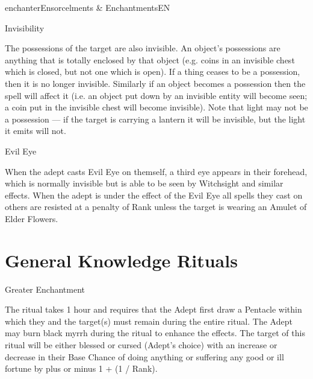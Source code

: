 \begin{College}[1.1]{enchanter}{Ensorcelments \& Enchantments}{EN}
\begin{spell}[G-8]{Invisibility}
\begin{effects}
The possessions of the target are also invisible. An object’s
possessions are anything that is totally enclosed by that object (e.g.
coins in an invisible chest which is closed, but not one which is
open).  If a thing ceases to be a possession, then it is no longer
invisible.  Similarly if an object becomes a possession then the spell
will affect it (i.e.  an object put down by an invisible entity will
become seen; a coin put in the invisible chest will become invisible).
Note that light may not be a possession — if the target is carrying a
lantern it will be invisible, but the light it emits will not.
\end{effects}
\end{spell}

\begin{spell}[G-9]{Evil Eye}

\begin{effects}
When the adept casts Evil Eye on themself, a third eye appears in
their forehead, which is normally invisible but is able to be seen by
Witchsight and similar effects.  When the adept is under the effect of
the Evil Eye all spells they cast on others are resisted at a penalty
of Rank unless the target is wearing an Amulet of Elder Flowers.
\end{effects}
\end{spell}

\section{General Knowledge Rituals}

\begin{ritual}[Q-1]{Greater Enchantment}

\begin{effects}
The ritual takes 1 hour and requires that the Adept first draw a
Pentacle within which they and the target(s) must remain during the
entire ritual. The Adept may burn black myrrh during the ritual to
enhance the effects.  The target of this ritual will be either blessed
or cursed (Adept’s choice) with an increase or decrease in their Base
Chance of doing anything or suffering any good or ill fortune by plus
or minus 1 + (1 / Rank).


\end{effects}
\end{ritual}
\end{College}
